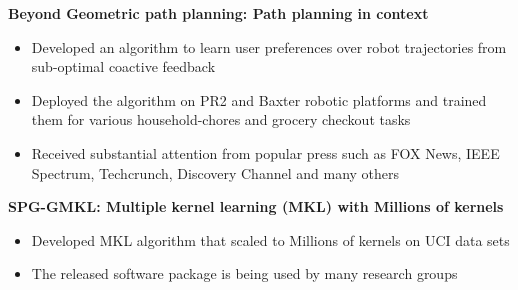 \documentclass[line,margin]{res}
\begin{document}
\begin{resume}
{\bf Beyond Geometric path planning: Path planning in context}

 \begin{itemize} \itemsep -2pt  %
 \item Developed an algorithm to learn user preferences over robot trajectories 
from sub-optimal coactive feedback 
 \item Deployed the algorithm on PR2 and Baxter robotic platforms and trained
them for various household-chores and grocery checkout tasks
 \item Received substantial attention from popular press such as FOX News, IEEE
Spectrum, Techcrunch, Discovery Channel and many others
 \end{itemize}

{\bf SPG-GMKL: Multiple kernel learning (MKL) with Millions of kernels}

\begin{itemize}
\item Developed MKL algorithm that scaled to Millions of kernels on UCI data
sets
\item The released software package is being used by many research groups
\end{itemize}



\iffalse  
\section{Teaching Experience}
 {\bf Cornell University,} Ithaca, NY, USA \hfill (2010-present)
    
 \vspace{-3mm}
  \hspace {4mm}  Teaching Assistant, Computer Science Department
 \begin{itemize} \itemsep -2pt  %
 \item CS 4740: Natural Language Processing, Spring 2013
 \item CS 4700: Artificial Intelligence, Fall 2012
 \end{itemize}
 
 {\bf Indian Institute of Technology Delhi}, India \hfill (2011 - 2012)
    
 \vspace{-3mm}
  \hspace {4mm}  Teaching Assistant, Electrical Engineering Department
 \begin{itemize} \itemsep -2pt  %
 \item EEL102: Introduction to Circuits, Spring 2011. Awarded with Undergraduate
 Teaching Assistant award.
 \item EEL101: Introduction to Circuits, Fall 2011
 \item EEL102: Introduction to Circuits, Spring 2012
 \end{itemize}
\fi


\end{resume}
\end{document}
